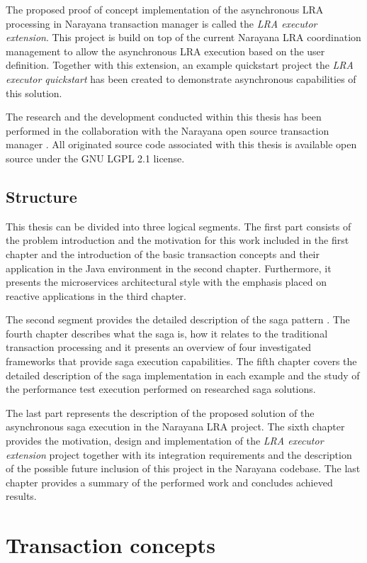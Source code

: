 \documentclass[oneside,
  digital, %
  table,   %
  lof,     %
  lot,     %
]{fithesis3}
\begin{document}
The proposed proof of concept implementation of the asynchronous LRA processing in Narayana transaction manager is called the \textit{LRA executor extension}. This project is build on top of the current Narayana LRA coordination management to allow the asynchronous LRA execution based on the user definition. Together with this extension, an example quickstart project the \textit{LRA executor quickstart} has been created to demonstrate asynchronous capabilities of this solution.

The research and the development conducted within this thesis has been performed in the collaboration with the Narayana open source transaction manager \cite{narayana}. All originated source code associated with this thesis is available open source under the GNU LGPL 2.1 license.

\section{Structure}

This thesis can be divided into three logical segments. The first part consists of the problem introduction and the motivation for this work included in the first chapter and the introduction of the basic transaction concepts and their application in the Java environment in the second chapter. Furthermore, it presents the microservices architectural style with the emphasis placed on reactive applications in the third chapter.

The second segment provides the detailed description of the saga pattern \cite{sagas_publ}. The fourth chapter describes what the saga is, how it relates to the traditional transaction processing and it presents an overview of four investigated frameworks that provide saga execution capabilities. The fifth chapter covers the detailed description of the saga implementation in each example and the study of the performance test execution performed on researched saga solutions.

The last part represents the description of the proposed solution of the asynchronous saga execution in the Narayana LRA project. The sixth chapter provides the motivation, design and implementation of the \textit{LRA executor extension} project together with its integration requirements and the description of the possible future inclusion of this project in the Narayana codebase. The last chapter provides a summary of the performed work and concludes achieved results.


\clearpage
\chapter{Transaction concepts}
\end{document}
